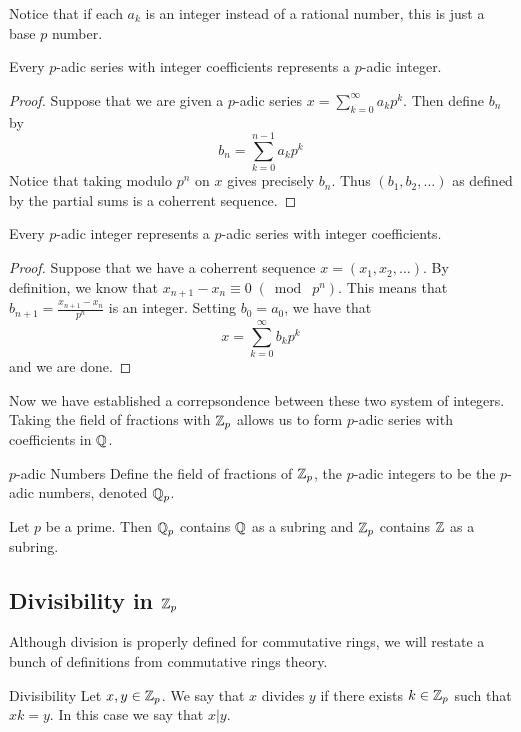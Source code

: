\documentclass[a4paper]{article}
\begin{document}
Notice that if each $a_k$ is an integer instead of a rational number, this is just a base $p$ number. 

\begin{prp}{}{} Every $p$-adic series with integer coefficients represents a $p$-adic integer. \tcbline
\begin{proof}
Suppose that we are given a $p$-adic series $x=\sum_{k=0}^\infty a_kp^k$. Then define $b_n$ by $$b_n=\sum_{k=0}^{n-1}a_kp^k$$ Notice that taking modulo $p^n$ on $x$ gives precisely $b_n$. Thus $(b_1,b_2,\dots)$ as defined by the partial sums is a coherrent sequence. 
\end{proof}
\end{prp}

\begin{prp}{}{} Every $p$-adic integer represents a $p$-adic series with integer coefficients. \tcbline
\begin{proof}
Suppose that we have a coherrent sequence $x=(x_1,x_2,\dots)$. By definition, we know that $x_{n+1}-x_n\equiv 0\;(\bmod\;p^n)$. This means that $b_{n+1}=\frac{x_{n+1}-x_n}{p^n}$ is an integer. Setting $b_0=a_0$, we have that $$x=\sum_{k=0}^\infty b_kp^k$$ and we are done. 
\end{proof}
\end{prp}

Now we have established a correpsondence between these two system of integers. Taking the field of fractions with $\mathbb{Z}_p$ allows us to form $p$-adic series with coefficients in $\mathbb{Q}$. 

\begin{defn}{$p$-adic Numbers}{} Define the field of fractions of $\mathbb{Z}_p$, the $p$-adic integers to be the $p$-adic numbers, denoted $\mathbb{Q}_p$. 
\end{defn}

\begin{lmm}{}{} Let $p$ be a prime. Then $\mathbb{Q}_p$ contains $\mathbb{Q}$ as a subring and $\mathbb{Z}_p$ contains $\mathbb{Z}$ as a subring. 
\end{lmm}

\subsection{Divisibility in $\mathbb{Z}_p$}
Although division is properly defined for commutative rings, we will restate a bunch of definitions from commutative rings theory. 

\begin{defn}{Divisibility}{} Let $x,y\in\mathbb{Z}_p$. We say that $x$ divides $y$ if there exists $k\in\mathbb{Z}_p$ such that $xk=y$. In this case we say that $x|y$. 
\end{defn}
\end{document}

